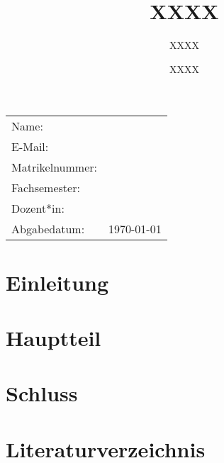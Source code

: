 \documentclass[11pt, a4paper]{scrartcl}
\title{XXXX}
\author{XXXX}
\date{XXXX}
\begin{document}
\hypersetup{pageanchor=false} 
\onehalfspacing 
\maketitle 
\thispagestyle{empty} 
\begin{center}

\vspace{\baselineskip}
\vspace{\baselineskip}
\vspace{\baselineskip}
\vspace{\baselineskip}
\vspace{\baselineskip}
\vspace{\baselineskip}
\vspace{\baselineskip}
\vspace{\baselineskip}

\begin{tabularx}{0.8\textwidth}{ 
  | >{\raggedright\arraybackslash}X 
  | >{\raggedright\arraybackslash}X | }
    \hline
    Name: &  \\
    E-Mail: &  \\
    Matrikelnummer: &  \\
    Fachsemester: &  \\
    Dozent*in: &   \\
    Abgabedatum: & \today \\
    \hline
\end{tabularx}
\end{center}
\pagebreak
\newpage

\tableofcontents 
\newpage
\listoffigures 
\newpage
\listoftables 
\newpage

\hypersetup{pageanchor=true}
\setcounter{page}{1}
\section{Einleitung}
\newpage

\section{Hauptteil}
\newpage

\section{Schluss}
\newpage

\section{Literaturverzeichnis}
\printbibliography[heading=none] 
\newpage

\thispagestyle{empty} 
\end{document}
